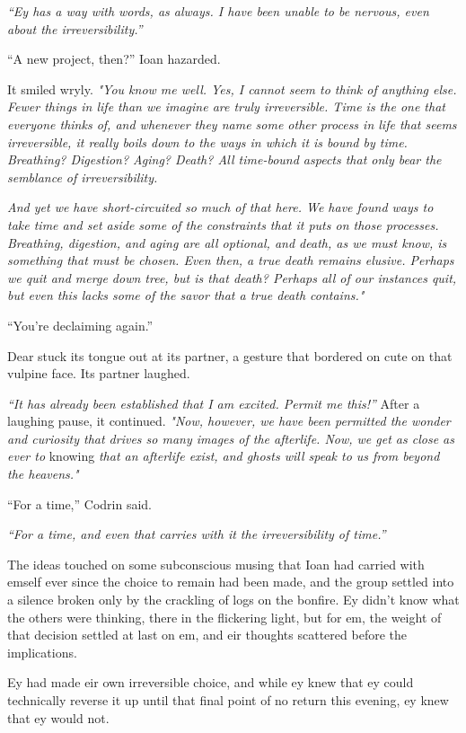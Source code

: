 \emph{``Ey has a way with words, as always. I have been unable to be nervous, even about the irreversibility.''}

``A new project, then?'' Ioan hazarded.

It smiled wryly. \emph{"You know me well. Yes, I cannot seem to think of anything else. Fewer things in life than we imagine are truly irreversible. Time is the one that everyone thinks of, and whenever they name some other process in life that seems irreversible, it really boils down to the ways in which it is bound by time. Breathing? Digestion? Aging? Death? All time-bound aspects that only bear the semblance of irreversibility.}

\emph{And yet we have short-circuited so much of that here. We have found ways to take time and set aside some of the constraints that it puts on those processes. Breathing, digestion, and aging are all optional, and death, as we must know, is something that must be chosen. Even then, a true death remains elusive. Perhaps we quit and merge down tree, but is that death? Perhaps all of our instances quit, but even this lacks some of the savor that a true death contains."}

``You're declaiming again.''

Dear stuck its tongue out at its partner, a gesture that bordered on cute on that vulpine face. Its partner laughed.

\emph{``It has already been established that I am excited. Permit me this!''} After a laughing pause, it continued. \emph{"Now, however, we have been permitted the wonder and curiosity that drives so many images of the afterlife. Now, we get as close as ever to} knowing \emph{that an afterlife exist, and ghosts will speak to us from beyond the heavens."}

``For a time,'' Codrin said.

\emph{``For a time, and even that carries with it the irreversibility of time.''}

The ideas touched on some subconscious musing that Ioan had carried with emself ever since the choice to remain had been made, and the group settled into a silence broken only by the crackling of logs on the bonfire. Ey didn't know what the others were thinking, there in the flickering light, but for em, the weight of that decision settled at last on em, and eir thoughts scattered before the implications.

Ey had made eir own irreversible choice, and while ey knew that ey could technically reverse it up until that final point of no return this evening, ey knew that ey would not.

